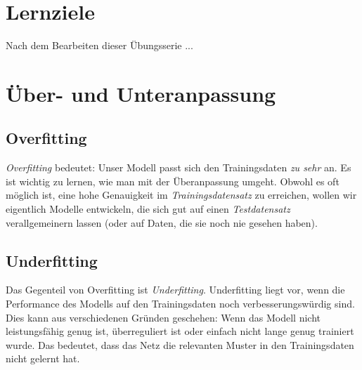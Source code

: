 \documentclass[11pt,a4paper,headinclude]{scrartcl}
\begin{document}
\section*{Lernziele}

Nach dem Bearbeiten dieser Übungsserie ...











\section*{Über- und Unteranpassung}

\subsection*{Overfitting}
\emph{Overfitting} bedeutet: Unser Modell passt sich den Trainingsdaten \emph{zu sehr} an. Es ist wichtig zu lernen, wie man mit der Überanpassung umgeht. Obwohl es oft möglich ist, eine hohe Genauigkeit im \emph{Trainingsdatensatz} zu erreichen, wollen wir eigentlich Modelle entwickeln, die sich gut auf einen \emph{Testdatensatz} verallgemeinern lassen (oder auf Daten, die sie noch nie gesehen haben).

\subsection*{Underfitting}
Das Gegenteil von Overfitting ist \emph{Underfitting}. Underfitting liegt vor, wenn die Performance des Modells auf den Trainingsdaten noch verbesserungswürdig sind. Dies kann aus verschiedenen Gründen geschehen: Wenn das Modell nicht leistungsfähig genug ist, überreguliert ist oder einfach nicht lange genug trainiert wurde. Das bedeutet, dass das Netz die relevanten Muster in den Trainingsdaten nicht gelernt hat.
\end{document}

